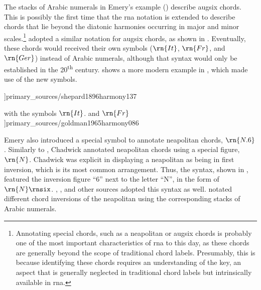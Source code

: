 


The stacks of Arabic numerals in Emery's example
() describe
\gls{augsix} chords. This is possibly the first time that
the \gls{rna} notation is extended to describe chords that
lie beyond the diatonic harmonies occurring in major and
minor scales.\footnote{Annotating special chords, such as a
\gls{neapolitan} or \gls{augsix} chords is probably one of
the most important characteristics of \gls{rna} to this day,
as these chords are generally beyond the scope of
traditional chord labels. Presumably, this is because
identifying these chords requires an understanding of the
key, an aspect that is generally neglected in traditional
chord labels but intrinsically available in \gls{rna}.}
\textcite{shepard1896harmony} adopted a similar notation for
\gls{augsix} chords, as shown in
. Eventually,
these chords would received their own symbols ($\rn{It}$,
$\rn{Fr}$, and $\rn{Ger}$) instead of Arabic numerals,
although that syntax would only be established in the
20\textsuperscript{th} century.
 shows a more
modern example in \textcite{goldman1965harmony}, which made
use of the new symbols.

\phdfigure[Augmented sixth chords in
\textcite[p.~137]{shepard1896harmony}]{primary_sources/shepard1896harmony137}

\phdfigure[Augmented sixth chords in
\textcite[p.~86]{goldman1965harmony} with the symbols
$\rn{It}$. and
$\rn{Fr}$]{primary_sources/goldman1965harmony086}

Emery also introduced a special symbol to annotate
\gls{neapolitan} chords, $\rn{N.6}$. Similarly to
\textcite{emery1879elements}, Chadwick annotated
\gls{neapolitan} chords using a special figure, $\rn{N}$.
Chadwick was explicit in displaying a \gls{neapolitan} as
being in first inversion, which is its most common
arrangement. Thus, the syntax, shown in
, featured
the inversion figure ``6'' next to the letter ``N'', in the
form of $\rn{N}\rnsix$. \textcite{heacox1907lessons},
\textcite{alchin1921applied}, and other sources adopted this
syntax as well. \textcite{heacox1907lessons} notated
different chord inversions of the \gls{neapolitan} using the
corresponding stacks of Arabic numerals.


